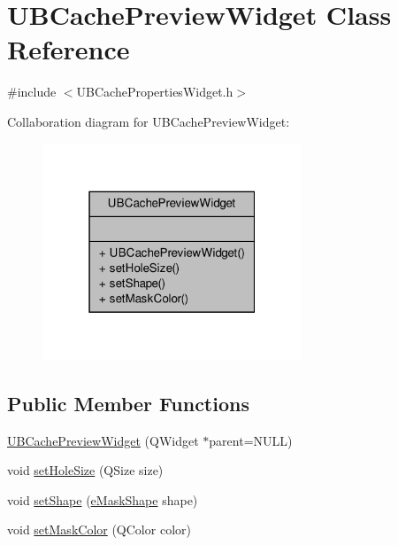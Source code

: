 \hypertarget{class_u_b_cache_preview_widget}{\section{U\-B\-Cache\-Preview\-Widget Class Reference}
\label{dc/d24/class_u_b_cache_preview_widget}
}


{\ttfamily \#include $<$U\-B\-Cache\-Properties\-Widget.\-h$>$}



Collaboration diagram for U\-B\-Cache\-Preview\-Widget\-:
\nopagebreak
\begin{figure}[H]
\begin{center}
\leavevmode
\includegraphics[width=220pt]{d9/d57/class_u_b_cache_preview_widget__coll__graph}
\end{center}
\end{figure}
\subsection*{Public Member Functions}
\begin{DoxyCompactItemize}
\item 
\hyperlink{class_u_b_cache_preview_widget_ac7ad36661d4fd01074b8ab97fb81547a}{U\-B\-Cache\-Preview\-Widget} (Q\-Widget $\ast$parent=N\-U\-L\-L)
\item 
void \hyperlink{class_u_b_cache_preview_widget_aa06ca6481bdd13017579fbbf21aab3f6}{set\-Hole\-Size} (Q\-Size size)
\item 
void \hyperlink{class_u_b_cache_preview_widget_afee0642e27af49528330e8e33bfbce3b}{set\-Shape} (\hyperlink{_u_b_graphics_cache_8h_ac59628c0f9ed257ff9874210c6ad3232}{e\-Mask\-Shape} shape)
\item 
void \hyperlink{class_u_b_cache_preview_widget_ae7ed3b27ad777a979deaa469f98f6234}{set\-Mask\-Color} (Q\-Color color)
\end{DoxyCompactItemize}


